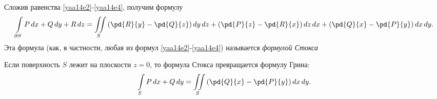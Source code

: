 Сложив равенства \eqref{yaa14e2}-\eqref{yaa14e4}, получим формулу
$$
\int\limits_{\partial S} P\,dx+Q\,dy+R\,dz = \iint\limits_S \left(\pd{R}{y}-\pd{Q}{z}\right)dy\,dz + \left(\pd{P}{z}-\pd{R}{x}\right)dz\,dx+\left(\pd{Q}{x}-\pd{P}{y}\right)dx\,dy.
$$
Эта формула (как, в частности, любая из формул \eqref{yaa14e2}-\eqref{yaa14e4}) называется \textit{формулой Стокса}

Если поверхность $S$ лежит на плоскости $z=0$, то формула Стокса превращается формулу Грина: 
$$
\int\limits_S P\,dx+Q\,dy = \iint\limits_S\left(\pd{Q}{x}-\pd{P}{y}\right)dx\,dy.
$$


